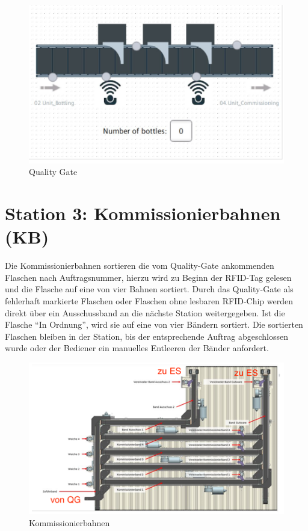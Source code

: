 \begin{figure}[h!]
    \centering
    \includegraphics*{figures/qualitygate.png}
    \caption{Quality Gate\cite{siemens2022}} %
    \label{fig:QualityGate} %
\end{figure}
\FloatBarrier
\section{Station 3: Kommissionierbahnen (KB)}\label{sec:Station 4: Kommissionierbahnen}

Die Kommissionierbahnen sortieren die vom Quality-Gate ankommenden Flaschen nach Auftragsnummer, hierzu wird zu Beginn der RFID-Tag gelesen und 
die Flasche auf eine von vier Bahnen sortiert. Durch das Quality-Gate als fehlerhaft markierte Flaschen oder Flaschen ohne lesbaren RFID-Chip 
werden direkt über ein Ausschussband an die nächste Station weitergegeben. Ist die Flasche “In Ordnung”, wird sie auf eine von vier Bändern 
sortiert. Die sortierten Flaschen bleiben in der Station, bis der entsprechende Auftrag abgeschlossen wurde oder der Bediener ein manuelles 
Entleeren der Bänder anfordert.

\begin{figure}[h!]
    \centering
    \includegraphics*{figures/Kommisonierbahn.png}
    \caption{Kommissionierbahnen\cite{siemens2022}} %
    \label{fig:Kommissionierbahnen} %
\end{figure}
\FloatBarrier
